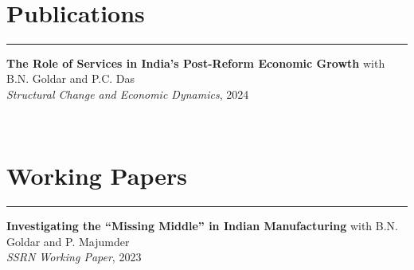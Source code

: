 \documentclass[11pt,a4paper]{article}
\begin{document}
\vspace{-0.1cm}\\

\section*{Publications}
\vspace{-0.5em}
\hrule
\vspace{0.5em}
\textbf{The Role of Services in India’s Post-Reform Economic Growth} with B.N. Goldar and P.C. Das\\
\textit{Structural Change and Economic Dynamics}, 2024

\vspace{-0.1cm}\\

\section*{Working Papers}
\vspace{-0.5em}
\hrule
\vspace{0.5em}
\textbf{Investigating the “Missing Middle” in Indian Manufacturing} with B.N. Goldar and P. Majumder\\
\textit{SSRN Working Paper}, 2023

\vspace{-0.1cm}\\

\end{document}
